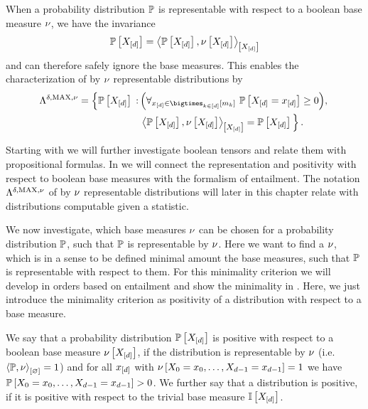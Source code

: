 When a probability distribution $\mathbb{P}$ is representable with respect to a boolean base measure $\nu$, we have the invariance
\begin{align*}
    \mathbb{P}\left[X_{[d]}\right]=\left\langle \mathbb{P}\left[X_{[d]}\right],\nu\left[X_{[d]}\right]\right\rangle_{\left[ X_{[d]} \right]}
\end{align*}
and can therefore safely ignore the base measures.
This enables the characterization of by $\nu$ representable distributions by
\begin{align*}
    \bmrealprobof{\basemeasure}
    = \Big\{ \probat{\shortcatvariables} \wcols
    & \Big(\uniquantwrtof{\shortcatindicesin}{\probat{\indexedshortcatvariables}\geq0}\Big) \ncond \\
    & \contractionof{\probwith,\basemeasurewith}{\shortcatvariables} = \probwith \Big\} \, .
\end{align*}

Starting with  we will further investigate boolean tensors and relate them with propositional formulas.
In  we will connect the representation and positivity with respect to boolean base measures with the formalism of entailment.
The notation $\Lambda^{\delta,\mathrm{MAX},\nu}$ of by $\nu$ representable distributions will later in this chapter relate with distributions computable given a statistic. %

We now investigate, which base measures $\nu$ can be chosen for a probability distribution $\mathbb{P}$, such that $\mathbb{P}$ is representable by $\nu$.
Here we want to find a $\nu$, which is in a sense to be defined minimal amount the base measures, such that $\mathbb{P}$ is representable with respect to them.
For this minimality criterion we will develop in  orders based on entailment and show the minimality in .
Here, we just introduce the minimality criterion as positivity of a distribution with respect to a base measure.

\begin{definition}
    \label{def:positivityBaseMeasure}
    We say that a probability distribution $\mathbb{P}\left[X_{[d]}\right]$ is positive with respect to a boolean base measure $\nu\left[X_{[d]}\right]$, if the distribution is representable by $\nu$ (i.e. $\left\langle \mathbb{P},\nu\right\rangle_{\left[ \varnothing \right]}=1$) and for all $x_{[d]}$ with $\nu\left[X_{0}=x_{0},\ldots,X_{d-1}=x_{d-1}\right]=1$ we have $\mathbb{P}\left[X_{0}=x_{0},\ldots,X_{d-1}=x_{d-1}\right]>0$.
    We further say that a distribution is positive, if it is positive with respect to the trivial base measure $\mathbb{I}\left[X_{[d]}\right]$.
\end{definition}

